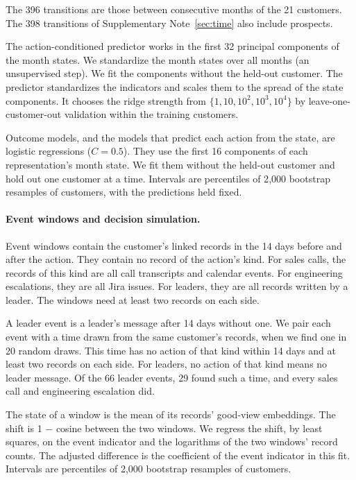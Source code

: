 \documentclass[11pt]{article}
\begin{document}
The 396 transitions are those between consecutive months of the 21 customers. The 398 transitions of Supplementary Note~\ref{sec:time} also include prospects.

The action-conditioned predictor works in the first 32 principal components of the month states. We standardize the month states over all months (an unsupervised step). We fit the components without the held-out customer. The predictor standardizes the indicators and scales them to the spread of the state components. It chooses the ridge strength from $\{1, 10, 10^2, 10^3, 10^4\}$ by leave-one-customer-out validation within the training customers.

Outcome models, and the models that predict each action from the state, are logistic regressions ($C = 0.5$). They use the first 16 components of each representation's month state. We fit them without the held-out customer and hold out one customer at a time. Intervals are percentiles of 2{,}000 bootstrap resamples of customers, with the predictions held fixed.

\paragraph{Event windows and decision simulation.} Event windows contain the customer's linked records in the 14 days before and after the action. They contain no record of the action's kind. For sales calls, the records of this kind are all call transcripts and calendar events. For engineering escalations, they are all Jira issues. For leaders, they are all records written by a leader. The windows need at least two records on each side.

A leader event is a leader's message after 14 days without one. We pair each event with a time drawn from the same customer's records, when we find one in 20 random draws. This time has no action of that kind within 14 days and at least two records on each side. For leaders, no action of that kind means no leader message. Of the 66 leader events, 29 found such a time, and every sales call and engineering escalation did.

The state of a window is the mean of its records' good-view embeddings. The shift is 1 $-$ cosine between the two windows. We regress the shift, by least squares, on the event indicator and the logarithms of the two windows' record counts. The adjusted difference is the coefficient of the event indicator in this fit. Intervals are percentiles of 2{,}000 bootstrap resamples of customers.
\end{document}
